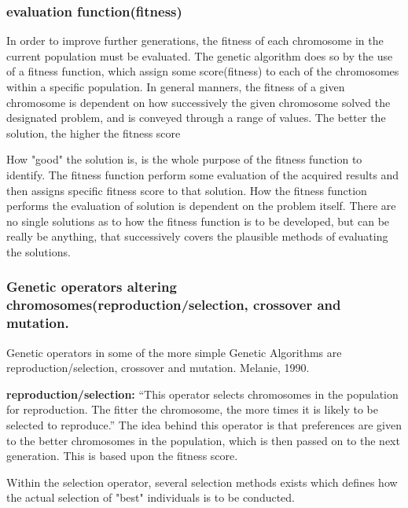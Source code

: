 \subsubsection*{evaluation function(fitness)}

In order to improve further generations, the fitness of each chromosome in the current population must be evaluated. The genetic algorithm does so by the use of a fitness function, which assign some score(fitness) to each of the chromosomes within a specific population.
In general manners, the fitness of a given chromosome is dependent on how successively the given chromosome solved the designated problem, and is conveyed through a range of values. The better the solution, the higher the fitness score \cite[pp. 8]{Melanie1990}

How "good" the solution is, is the whole purpose of the fitness function to identify. The fitness function perform some evaluation of the acquired results and then assigns specific fitness score to that solution. How the fitness function performs the evaluation of solution is dependent on the problem itself. There are no single solutions as to how the fitness function is to be developed, but can be really be anything, that successively covers the plausible methods of evaluating the solutions. \cite[pp. 31]{Sivanandam2008}

\subsubsection*{Genetic operators altering chromosomes(reproduction/selection, crossover and mutation.}


Genetic operators in some of the more simple Genetic Algorithms are reproduction/selection, crossover and mutation. Melanie, 1990. \cite{Melanie1990}

\textbf{reproduction/selection:} \enquote{This operator selects chromosomes in the population for reproduction. The fitter the chromosome, the more times it is likely to be selected to reproduce.} \cite[pp. 8]{Melanie1990}
The idea behind this operator is that preferences are given to the better chromosomes in the population, which is then passed on to the next generation. This is based upon the fitness score.

Within the selection operator, several selection methods exists which defines how the actual selection of "best" individuals is to be conducted.

